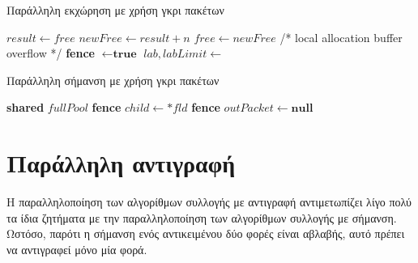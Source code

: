 \begin{greek}
\begin{algorithm}[H]
  \caption{Παράλληλη εκχώρηση με χρήση γκρι πακέτων}
  \label{alg:par5}
  \begin{algorithmic}[1]
      \State $result \gets free$
      \State $newFree \gets result + n$
        \State $free \gets newFree$
        \State {}
      \EndIf
      \Statex
      \State /* local allocation buffer overflow */
      \State \textbf{fence}
        \State {} $\gets \textbf{true}$
      \EndFor
      \State $lab, labLimit \gets$ 
        \State {}
      \EndIf
      \State {} 
    \EndFunction
  \end{algorithmic}
\end{algorithm}

\begin{algorithm}[H]
  \caption{Παράλληλη σήμανση με χρήση γκρι πακέτων}
  \label{alg:par6}
  \begin{algorithmic}[1]
    \State \textbf{shared} $fullPool$ 
    \Statex
          \State {}
          \State \textbf{fence}
        \EndIf
      \EndIf
    \EndProcedure
    \Statex
            \State $child \gets *fld$
              \State {}
              \State {}
            \EndIf
          \EndFor   
        \Else
          \State {} 
        \EndIf
      \EndFor
    \EndProcedure
    \Statex
      \State \textbf{fence}
      \State {}
      \State $outPacket \gets \textbf{null}$
    \EndProcedure
  \end{algorithmic}
\end{algorithm}

\section{Παράλληλη αντιγραφή}
Η παραλληλοποίηση των αλγορίθμων συλλογής με αντιγραφή αντιμετωπίζει
λίγο πολύ τα ίδια ζητήματα με την παραλληλοποίηση των αλγορίθμων
συλλογής με σήμανση. Ωστόσο, παρότι η σήμανση ενός αντικειμένου
δύο φορές είναι αβλαβής, αυτό πρέπει να αντιγραφεί μόνο μία φορά.


\end{greek}
